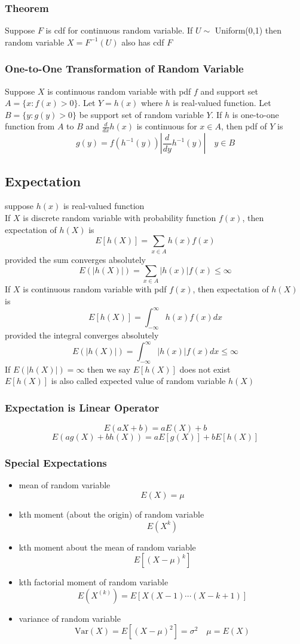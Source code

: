 \documentclass[11pt]{article}
\begin{document}
\subsubsection*{Theorem}
Suppose $F$ is cdf for continuous random variable. If $U\sim$ Uniform(0,1) then random variable $X=F^{-1}(U)$ also has cdf $F$
\subsubsection{One-to-One Transformation of Random Variable}
Suppose $X$ is continuous random variable with pdf $f$ and support set $A=\{x:f(x)>0\}$.
Let $Y=h(x)$ where $h$ is real-valued function. Let $B=\{y:g(y)>0\}$ be support set of random variable $Y$.
If $h$ is one-to-one function from $A$ to $B$ and $\frac{d}{dx}h(x)$ is continuous for $x\in A$, then pdf of $Y$ is 
\[g(y) = f(h^{-1}(y))|\frac{d}{dy}h^{-1}(y)|\quad y\in B\]
\subsection{Expectation}
suppose $h(x)$ is real-valued function \\
If $X$ is discrete random variable with probability function $f(x)$, then expectation of $h(X)$ is
\[E[h(X)] = \sum_{x\in A}h(x)f(x)\]
provided the sum converges absolutely
\[E(|h(X)|) = \sum_{x\in A}|h(x)|f(x)\leq\infty\]
If $X$ is continuous random variable with pdf $f(x)$, then expectation of $h(X)$ is
\[E[h(X)] = \int_{-\infty}^{\infty}h(x)f(x)dx\]
provided the integral converges absolutely
\[E(|h(X)|) = \int_{-\infty}^{\infty}|h(x)|f(x)dx\leq\infty\]
If $E(|h(X)|)=\infty$ then we say $E[h(X)]$ does not exist \\
$E[h(X)]$ is also called expected value of random variable $h(X)$
\subsubsection{Expectation is Linear Operator}
\[E(aX+b) = aE(X)+b\]
\[E(ag(X)+bh(X)) = aE[g(X)]+bE[h(X)]\]
\subsubsection{Special Expectations}
\begin{itemize}
    \item mean of random variable \[E(X)=\mu\]
    \item kth moment (about the origin) of random variable \[E(X^k)\]
    \item kth moment about the mean of random variable \[E[(X-\mu)^k]\]
    \item kth factorial moment of random variable \[E(X^{(k)}) = E[X(X-1)\cdots(X-k+1)]\]
    \item variance of random variable \[\text{Var}(X)=E[(X-\mu)^2] = \sigma^2\quad \mu=E(X)\]
\end{itemize}
\end{document}
